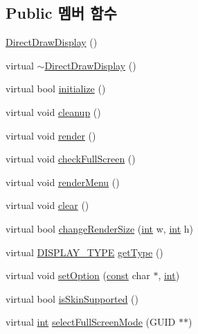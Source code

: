 \subsection*{Public 멤버 함수}
\begin{DoxyCompactItemize}
\item 
\mbox{\hyperlink{class_direct_draw_display_a09b8b740318dfadec37110b0887dd9e5}{Direct\+Draw\+Display}} ()
\item 
virtual \mbox{\hyperlink{class_direct_draw_display_aa0649f887a0adb27964a13b9f1c5e059}{$\sim$\+Direct\+Draw\+Display}} ()
\item 
virtual bool \mbox{\hyperlink{class_direct_draw_display_a310109ff2530aaa109ed048ede6e1564}{initialize}} ()
\item 
virtual void \mbox{\hyperlink{class_direct_draw_display_a9ef5e33d516c118742d7cf3b52ed28fc}{cleanup}} ()
\item 
virtual void \mbox{\hyperlink{class_direct_draw_display_ab09489c28cb1fb5aaab0e51824fe3a28}{render}} ()
\item 
virtual void \mbox{\hyperlink{class_direct_draw_display_ada4eacae559651471181ec781dce1716}{check\+Full\+Screen}} ()
\item 
virtual void \mbox{\hyperlink{class_direct_draw_display_a0a207e0d27c3ccf35d0b5b56fe78678e}{render\+Menu}} ()
\item 
virtual void \mbox{\hyperlink{class_direct_draw_display_a90c0576a1ad6b80c1377df94d4eaa1a2}{clear}} ()
\item 
virtual bool \mbox{\hyperlink{class_direct_draw_display_a4e91a6dc8d9e32c8f26d11e3879bc850}{change\+Render\+Size}} (\mbox{\hyperlink{_util_8cpp_a0ef32aa8672df19503a49fab2d0c8071}{int}} w, \mbox{\hyperlink{_util_8cpp_a0ef32aa8672df19503a49fab2d0c8071}{int}} h)
\item 
virtual \mbox{\hyperlink{_display_8h_aa50f63b0688d0250e0be64d8401d09a0}{D\+I\+S\+P\+L\+A\+Y\+\_\+\+T\+Y\+PE}} \mbox{\hyperlink{class_direct_draw_display_ab680561928153be1285c826d3e4f0dd7}{get\+Type}} ()
\item 
virtual void \mbox{\hyperlink{class_direct_draw_display_a94010855bad5354842c7c7062ab4ce03}{set\+Option}} (\mbox{\hyperlink{getopt1_8c_a2c212835823e3c54a8ab6d95c652660e}{const}} char $\ast$, \mbox{\hyperlink{_util_8cpp_a0ef32aa8672df19503a49fab2d0c8071}{int}})
\item 
virtual bool \mbox{\hyperlink{class_direct_draw_display_af98136de6311fb224288f7e7cbb36106}{is\+Skin\+Supported}} ()
\item 
virtual \mbox{\hyperlink{_util_8cpp_a0ef32aa8672df19503a49fab2d0c8071}{int}} \mbox{\hyperlink{class_direct_draw_display_a10d4f6b14b3f4de2edb60e05a4277d25}{select\+Full\+Screen\+Mode}} (G\+U\+ID $\ast$$\ast$)
\end{DoxyCompactItemize}


